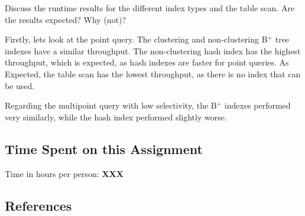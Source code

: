 \documentclass[11pt]{scrartcl}
\begin{document}
Discuss the runtime results for the different index types and the table scan. Are the results expected? Why (not)?

Firstly, lets look at the point query.
The clustering and non-clustering B$^+$ tree indexes have a similar throughput.
The non-clustering hash index has the highest throughput, which is expected, as hash indexes are faster for point queries.
As Expected, the table scan has the lowest throughput, as there is no index that can be used.

Regarding the multipoint query with low selectivity, the B$^+$ indexes performed very similarly, while the hash index
performed slightly worse.

\subsection*{Time Spent on this Assignment}

Time in hours per person: \textbf{XXX}

\subsection*{References}

\printbibliography
\end{document}
